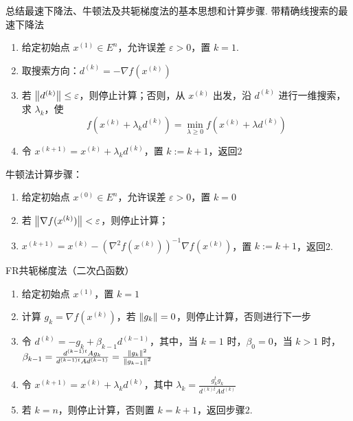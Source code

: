 \begin{problem}
    总结最速下降法、牛顿法及共轭梯度法的基本思想和计算步骤.
    \Answer 带精确线搜索的最速下降法 \begin{enumerate}
        \item 给定初始点 $x^{(1)} \in E^n$，允许误差 $\varepsilon > 0$，置 $k = 1$.
        \item 取搜索方向：$d^{(k)} = -\nabla f(x^{(k)})$
        \item 若 $\norm{d^{(k)}} \le \varepsilon$，则停止计算；否则，从 $x^{(k)}$ 出发，沿 $d^{(k)}$ 进行一维搜索，求 $\lambda_k$，使 \[f(x^{(k)} + \lambda_k d^{(k)}) = \min_{\lambda \ge 0} f(x^{(k)} + \lambda d^{(k)})\]
        \item 令 $x^{(k + 1)} = x^{(k)} + \lambda_k d^{(k)}$，置 $k := k + 1$，返回2
    \end{enumerate}

    牛顿法计算步骤：\begin{enumerate}
        \item 给定初始点 $x^{(0)} \in E^n$，允许误差 $\varepsilon > 0$，置 $k = 0$
        \item 若 $\norm{\nabla f(x^{(k)})} < \varepsilon$，则停止计算；
        \item $x^{(k + 1)} = x^{(k)} - \left(\nabla^2f(x^{(k)})\right)^{-1}\nabla f(x^{(k)})$，置 $k:=k + 1$，返回2.
    \end{enumerate}

    FR共轭梯度法（二次凸函数）\begin{enumerate}
        \item 给定初始点 $x^{(1)}$，置 $k = 1$
        \item 计算 $g_k = \nabla f(x^{(k)})$，若 $\norm{g_k} = 0$，则停止计算，否则进行下一步
        \item 令 $d^{(k)} = -g_k + \beta_{k - 1}d^{(k - 1)}$，其中，当 $k = 1$ 时，$\beta_0 = 0$，当 $k > 1$ 时，$\beta_{k - 1} = \frac{d^{(k - 1)t}Ag_k}{d^{(k - 1)t}Ad^{(k - 1)}} = \frac{\norm{g_k}^2}{\norm{g_{k - 1}}^2}$
        \item 令 $x^{(k + 1)} = x^{(k)} + \lambda_kd^{(k)}$，其中 $\lambda_k = \frac{g_k^tg_k}{d^{(k)t}Ad^{(k)}}$
        \item 若 $k = n$，则停止计算，否则置 $k = k + 1$，返回步骤2.
    \end{enumerate}
\end{problem}

